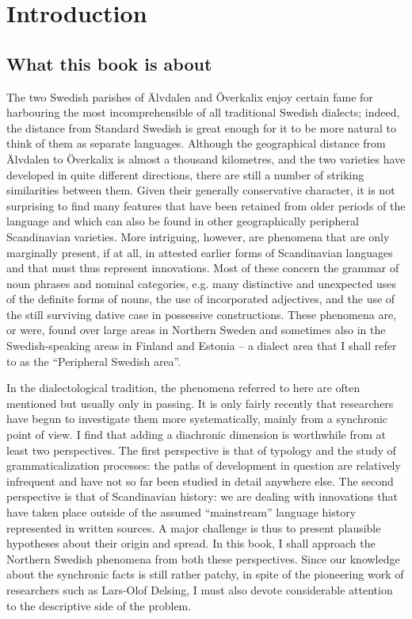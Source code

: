 ﻿\chapter{Introduction}
\section{What this book is about}

The two Swedish parishes of Älvdalen and Överkalix enjoy certain fame for harbouring the most incomprehensible of all traditional Swedish dialects; indeed, the distance from Standard Swedish is great enough for it to be more natural to think of them as separate languages. Although the geographical distance from Älvdalen to Överkalix is almost a thousand kilometres, and the two varieties have developed in quite different directions, there are still a number of striking similarities between them. Given their generally conservative character, it is not surprising to find many features that have been retained from older periods of the language and which can also be found in other geographically peripheral Scandinavian varieties. More intriguing, however, are phenomena that are only marginally present, if at all, in attested earlier forms of Scandinavian languages and that must thus represent innovations. Most of these concern the grammar of noun phrases and nominal categories, e.g. many distinctive and unexpected uses of the definite forms of nouns, the use of incorporated adjectives, and the use of the still surviving dative case in possessive constructions. These phenomena are, or were, found over large areas in Northern Sweden and sometimes also in the Swedish-speaking areas in Finland and Estonia – a dialect area that I shall refer to as the “Peripheral Swedish area”.


In the dialectological tradition, the phenomena referred to here are often mentioned but usually only in passing. It is only fairly recently that researchers have begun to investigate them more systematically, mainly from a synchronic point of view. I find that adding a diachronic dimension is worthwhile from at least two perspectives. The first perspective is that of typology and the study of grammaticalization processes: the paths of development in question are relatively infrequent and have not so far been studied in detail anywhere else. The second perspective is that of Scandinavian history: we are dealing with innovations that have taken place outside of the assumed “mainstream” language history represented in written sources. A major challenge is thus to present plausible hypotheses about their origin and spread. In this book, I shall approach the Northern Swedish phenomena from both these perspectives. Since our knowledge about the synchronic facts is still rather patchy, in spite of the pioneering work of researchers such as Lars-Olof Delsing, I must also devote considerable attention to the descriptive side of the problem.

